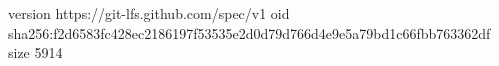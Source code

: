 version https://git-lfs.github.com/spec/v1
oid sha256:f2d6583fc428ec2186197f53535e2d0d79d766d4e9e5a79bd1c66fbb763362df
size 5914

